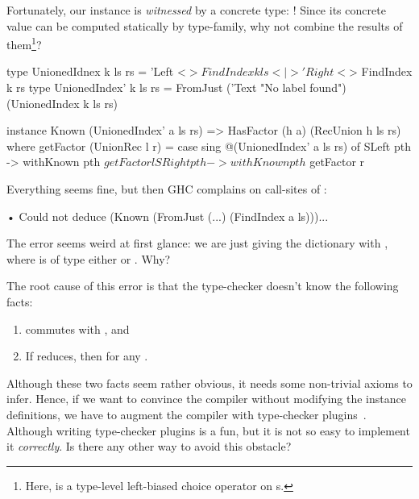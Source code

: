 \documentclass[demotion-paper.tex]{subfiles}
\begin{document}
Fortunately, our  instance is \emph{witnessed} by a concrete type: !
Since its concrete value can be computed statically by  type-family, why not combine the results of them\footnote{Here, \hask{(<|>)} is a type-level left-biased choice operator on s.}?
\begin{code}
type UnionedIdnex k ls rs = 
  'Left <$> FindIndex k ls
  <|> 'Right <$> FindIndex k rs
type UnionedIndex' k ls rs = FromJust 
  ('Text "No label found") (UnionedIndex k ls rs)

instance Known (UnionedIndex' a ls rs)
  => HasFactor (h a) (RecUnion h ls rs) where
  getFactor (UnionRec l r) =
    case sing @(UnionedIndex' a ls rs) of
      SLeft pth -> withKnown pth $ getFactor l
      SRight pth -> withKnown pth $ getFactor r
\end{code}
Everything seems fine, but then GHC complains on call-sites of :
\begin{repl}
• Could not deduce 
  (Known (FromJust (...) (FindIndex a ls)))...
\end{repl}
The error seems weird at first glance: we are just giving the  dictionary with , where  is of type either  or . Why?

The root cause of this error is that the type-checker doesn't know the following facts:
\begin{enumerate}
  \item {} commutes with \haskinline{(<$>)}, and
  \item If  reduces, then  for any .
\end{enumerate}
Although these two facts seem rather obvious, it needs some non-trivial axioms to infer.
Hence, if we want to convince the compiler without modifying the instance definitions, we have to augment the compiler with type-checker plugins~\cite{GHC-Team:2020aa}.
Although writing type-checker plugins is a fun, but it is not so easy to implement it \emph{correctly}. Is there any other way to avoid this obstacle?
\end{document}
